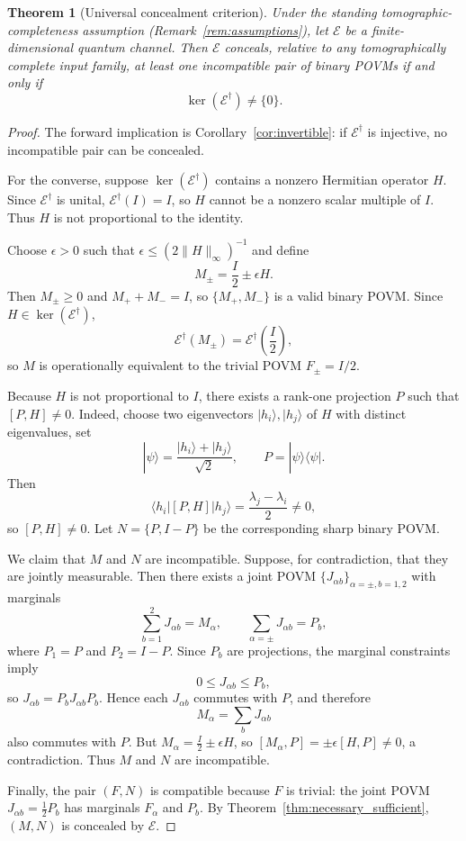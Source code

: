 \documentclass[
aps,pra,twocolumn,10pt,
superscriptaddress,longbibliography,floatfix
]{revtex4-2}
\newtheorem{theorem}{Theorem}[section]
\begin{document}
\begin{theorem}[Universal concealment criterion]
\label{thm:universal_concealment}
Under the standing tomographic-completeness assumption (Remark~\ref{rem:assumptions}), let $\mathcal E$ be a finite-dimensional quantum channel. Then $\mathcal E$ conceals, relative to any tomographically complete input family, at least one incompatible pair of binary POVMs if and only if
\[
\ker(\mathcal E^\dagger)\neq\{0\}.
\]
\end{theorem}

\begin{proof}
The forward implication is Corollary~\ref{cor:invertible}: if $\mathcal E^\dagger$ is injective, no incompatible pair can be concealed.

For the converse, suppose $\ker(\mathcal E^\dagger)$ contains a nonzero Hermitian operator $H$. Since $\mathcal E^\dagger$ is unital, $\mathcal E^\dagger(I)=I$, so $H$ cannot be a nonzero scalar multiple of $I$. Thus $H$ is not proportional to the identity.

Choose $\epsilon>0$ such that $\epsilon \le (2\|H\|_\infty)^{-1}$ and define
\[
M_\pm = \frac{I}{2} \pm \epsilon H.
\]
Then $M_\pm\ge0$ and $M_++M_-=I$, so $\{M_+,M_-\}$ is a valid binary POVM. Since $H\in\ker(\mathcal E^\dagger)$,
\[
\mathcal E^\dagger(M_\pm) = \mathcal E^\dagger\left(\frac{I}{2}\right),
\]
so $M$ is operationally equivalent to the trivial POVM $F_\pm=I/2$.

Because $H$ is not proportional to $I$, there exists a rank-one projection $P$ such that $[P,H]\neq0$. Indeed, choose two eigenvectors \(|h_i\rangle, |h_j\rangle\) of \(H\) with distinct eigenvalues, set
\[
|\psi\rangle = \frac{|h_i\rangle + |h_j\rangle}{\sqrt2}, \qquad P = |\psi\rangle\langle\psi|.
\]
Then
\[
\langle h_i | [P,H] | h_j \rangle = \frac{\lambda_j - \lambda_i}{2} \neq 0,
\]
so \([P,H] \neq 0\). Let \(N=\{P,I-P\}\) be the corresponding sharp binary POVM.

We claim that $M$ and $N$ are incompatible. Suppose, for contradiction, that they are jointly measurable. Then there exists a joint POVM $\{J_{\alpha b}\}_{\alpha=\pm,b=1,2}$ with marginals
\[
\sum_{b=1}^2 J_{\alpha b}=M_\alpha,\qquad
\sum_{\alpha=\pm} J_{\alpha b}=P_b,
\]
where $P_1=P$ and $P_2=I-P$. Since $P_b$ are projections, the marginal constraints imply
\[
0\le J_{\alpha b}\le P_b,
\]
so $J_{\alpha b}=P_b J_{\alpha b}P_b$. Hence each $J_{\alpha b}$ commutes with $P$, and therefore
\[
M_\alpha=\sum_b J_{\alpha b}
\]
also commutes with $P$. But $M_\alpha=\frac I2\pm\epsilon H$, so $[M_\alpha,P]=\pm\epsilon[H,P]\neq0$, a contradiction. Thus $M$ and $N$ are incompatible.

Finally, the pair $(F,N)$ is compatible because $F$ is trivial: the joint POVM \(J_{\alpha b} = \frac12 P_b\) has marginals \(F_\alpha\) and \(P_b\). By Theorem~\ref{thm:necessary_sufficient}, $(M,N)$ is concealed by $\mathcal E$.
\end{proof}
\end{document}
